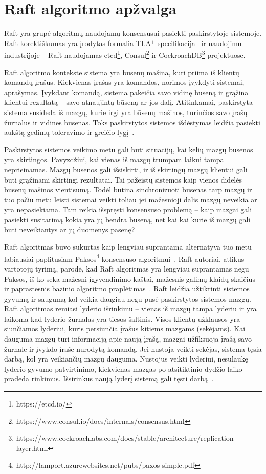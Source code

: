 \documentclass{VUMIFPSkursinis}
\begin{document}
\section{Raft algoritmo apžvalga}

Raft yra grupė algoritmų naudojamų konsensusui pasiekti paskirstytoje sistemoje. Raft korektiškumas yra įrodytas formalia TLA$^+$ specifikacija~\cite{ongaro_consensus} ir naudojimu industrijoje -- Raft naudojamas etcd\footnote{https://etcd.io/}, Consul\footnote{https://www.consul.io/docs/internals/consensus.html} ir CockroachDB\footnote{https://www.cockroachlabs.com/docs/stable/architecture/replication-layer.html} projektuose. 

Raft algoritmo kontekste sistema yra būsenų mašina, kuri priima iš klientų komandų įrašus. Kiekvienas įrašas yra komandos, norimos įvykdyti sistemai, aprašymas. Įvykdant komandą, sistema pakeičia savo vidinę būseną ir grąžina klientui rezultatą -- savo atnaujintą būseną ar jos dalį. Atitinkamai, paskirstyta sistema susideda iš mazgų, kurie irgi yra būsenų mašinos, turinčios savo įrašų žurnalus ir vidines būsenas. Toks paskirstytos sistemos išdėstymas leidžia pasiekti aukštą gedimų toleravimo ir greičio lygį~\cite{ongaro_consensus, steen_distributed_2017}.

Paskirstytos sistemos veikimo metu gali būti situacijų, kai kelių mazgų būsenos yra skirtingos. Pavyzdžiui, kai vienas iš mazgų trumpam laikui tampa neprieinamas. Mazgų būsenos gali išsiskirti, ir iš skirtingų mazgų klientui gali būti grąžinami skirtingi rezultatai. Tai pažeistų sistemos kaip vienos didelės būsenų mašinos vientisumą. Todėl būtina sinchronizuoti būsenas tarp mazgų ir tuo pačiu metu leisti sistemai veikti toliau jei mažesnioji dalis mazgų neveikia ar yra nepasiekiama. Tam reikia išspręsti konsensuso problemą -- kaip mazgai gali pasiekti susitarimą kokia yra jų bendra būseną, net kai kai kurie iš mazgų gali būti neveikiantys ar jų duomenys pasenę?

Raft algoritmas buvo sukurtas kaip lengviau suprantama alternatyva tuo metu labiausiai paplitusiam Paksos\footnote{http://lamport.azurewebsites.net/pubs/paxos-simple.pdf} konsensuso algoritmui~\cite{ongaro_consensus, diego_designing_2016}. Raft autoriai, atlikus vartotojų tyrimą, parodė, kad Raft algoritmas yra lengviau suprantamas negu Paksos, iš ko seka mažesni įgyvendinimo kaštai, mažesnis galimų klaidų skaičius ir paprastesnis bazinio algoritmo praplėtimas~\cite{ongaro_consensus}. Raft leidžia užtikrinti sistemos gyvumą ir saugumą kol veikia daugiau negu pusė paskirstytos sistemos mazgų. Raft algoritmas remiasi lyderio išrinkimu -- vienas iš mazgų tampa lyderiu ir yra laikoma kad lyderio žurnalas yra tiesos šaltinis. Visos klientų užklausos yra siunčiamos lyderiui, kuris persiunčia įrašus kitiems mazgams (sekėjams). Kai dauguma mazgų turi informaciją apie naują įrašą, mazgai užfiksuoja įrašą savo žurnale ir įvykdo įraše nurodytą komandą. Jei nustoja veikti sekėjas, sistema tęsia darbą, kol yra veikiančių mazgų dauguma. Nustojus veikti lyderiui, nesulaukę lyderio gyvumo patvirtinimo, kiekvienas mazgas po atsitiktinio dydžio laiko pradeda rinkimus. Išsirinkus naują lyderį sistemą gali tęsti darbą~\cite{ongaro_consensus}. 
\end{document}
